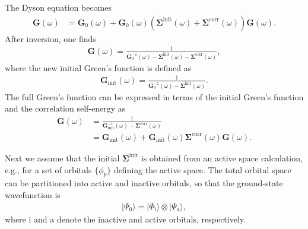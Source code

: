 \documentclass[aip,jcp,reprint,noshowkeys,superscriptaddress]{revtex4-1}
\newcommand{\bG}{\boldsymbol{G}}
\newcommand{\bSigma}{\boldsymbol{\Sigma}}
\begin{document}
The Dyson equation becomes 
\begin{align}
\bG(\omega) &= \bG_0(\omega) + \bG_0(\omega) \left( \bSigma^{\text{init}}(\omega) + \bSigma^{\text{corr}}(\omega) \right) \bG(\omega).
\end{align}
After inversion, one finds 
\begin{align}
\bG(\omega) = \frac{1}{\bG_0^{-1}(\omega) - \bSigma^{\text{init}}(\omega) - \bSigma^{\text{corr}}(\omega)},
\end{align}
where the new initial Green's function is defined as 
\begin{align}
  \bG_{\text{init}}(\omega) = \frac{1}{\bG_0^{-1}(\omega) - \bSigma^{\text{init}}(\omega)} .
\end{align}
The full Green's function can be expressed in terms of the initial Green's function and the correlation self-energy as
\begin{align}
\bG(\omega) &= \frac{1}{\bG_{\text{init}}^{-1}(\omega) - \bSigma^{\text{corr}}(\omega)} \nonumber \\
&= \bG_{\text{init}}(\omega) + \bG_{\text{init}}(\omega) \bSigma^{\text{corr}}(\omega) \bG(\omega).
\end{align}

Next we assume that the initial $\bSigma^{\text{init}}$ is obtained from an active space calculation, e.g., for a set of orbitals $\{ \phi_p \}$ defining the active space.
The total orbital space can be partitioned into active and inactive orbitals, so that the ground-state wavefunction is 
\begin{align}
  | \Psi_0 \rangle = | \Phi_\mathrm{i} \rangle \otimes | \Psi_\mathrm{a} \rangle,
\end{align}
where $\mathrm{i}$ and $\mathrm{a}$ denote the inactive and active orbitals, respectively.
\end{document}

